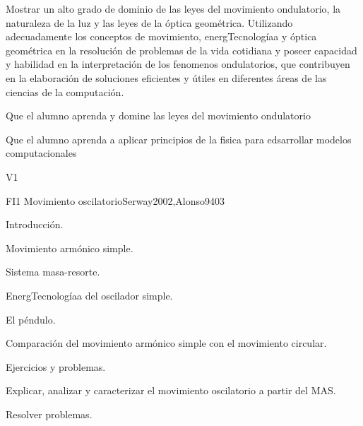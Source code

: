 \begin{syllabus}


\begin{justification}
Mostrar un alto grado de dominio de las leyes del movimiento ondulatorio,
la naturaleza de la luz y las leyes de la óptica geométrica.
Utilizando  adecuadamente los conceptos de movimiento, energTecnologíaa y óptica
geométrica en la resolución de problemas de la vida cotidiana y poseer
capacidad y habilidad en la interpretación de los fenomenos ondulatorios,
que contribuyen en la elaboración de soluciones eficientes y útiles en
diferentes áreas de las ciencias de la computación.
\end{justification}

\begin{goals}
\item Que el alumno aprenda y domine las leyes del movimiento ondulatorio
\item Que el alumno aprenda a aplicar principios de la fisica para edsarrollar modelos computacionales
\end{goals}

\begin{outcomes}{V1}
\end{outcomes}

\begin{unit}{FI1 Movimiento oscilatorio}{}{Serway2002,Alonso94}{0}{3}
\begin{topics}
      \item Introducción.
      \item Movimiento armónico simple.
      \item Sistema masa-resorte.
      \item EnergTecnologíaa del oscilador simple.
      \item El péndulo.
      \item Comparación del movimiento armónico simple con el movimiento circular.
      \item Ejercicios y problemas.
   \end{topics}

   \begin{learningoutcomes}
      \item Explicar, analizar y caracterizar el movimiento oscilatorio a partir del MAS.
      \item Resolver problemas.
   \end{learningoutcomes}
\end{unit}


\end{syllabus}
